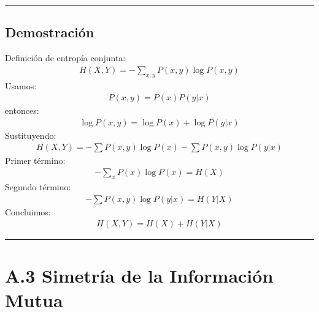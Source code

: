 \documentclass[letterpaper,10pt,english]{jupyterBook}
\begin{document}
\bigskip\hrule\bigskip



\subsection{Demostración}
\label{\detokenize{05_appendices/proofs:id2}}
\sphinxAtStartPar
Definición de entropía conjunta:
\begin{equation*}
\begin{split}
H(X,Y)=-\sum_{x,y}P(x,y)\log P(x,y)
\end{split}
\end{equation*}
\sphinxAtStartPar
Usamos:
\begin{equation*}
\begin{split}
P(x,y)=P(x)P(y|x)
\end{split}
\end{equation*}
\sphinxAtStartPar
entonces:
\begin{equation*}
\begin{split}
\log P(x,y)=\log P(x)+\log P(y|x)
\end{split}
\end{equation*}
\sphinxAtStartPar
Sustituyendo:
\begin{equation*}
\begin{split}
H(X,Y)=
-\sum P(x,y)\log P(x)
-\sum P(x,y)\log P(y|x)
\end{split}
\end{equation*}
\sphinxAtStartPar
Primer término:
\begin{equation*}
\begin{split}
-\sum_x P(x)\log P(x)=H(X)
\end{split}
\end{equation*}
\sphinxAtStartPar
Segundo término:
\begin{equation*}
\begin{split}
-\sum P(x,y)\log P(y|x)=H(Y|X)
\end{split}
\end{equation*}
\sphinxAtStartPar
Concluimos:
\begin{equation*}
\begin{split}
H(X,Y)=H(X)+H(Y|X)
\end{split}
\end{equation*}

\bigskip\hrule\bigskip



\section{A.3 Simetría de la Información Mutua}
\label{\detokenize{05_appendices/proofs:a-3-simetria-de-la-informacion-mutua}}
\end{document}
